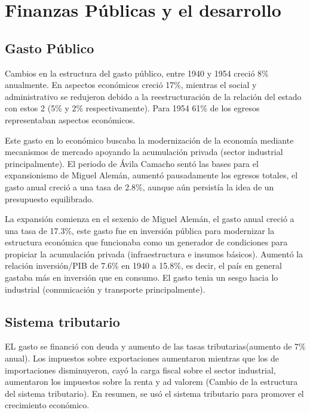 
\section{Finanzas Públicas y el desarrollo}
\subsection{Gasto Público}
Cambios en la estructura del gasto público, entre 1940 y 1954 creció 8\% anualmente. En aspectos económicos creció 17\%, mientras el social y administrativo se redujeron debido a la reestructuración de la relación del estado con estos 2 (5\% y 2\% respectivamente). Para 1954 61\% de los egresos representaban aspectos económicos.

Este gasto en lo económico buscaba la modernización de la economía mediante mecanismos de mercado apoyando la acumulación privada (sector industrial principalmente).
El periodo de Ávila Camacho sentó las bases para el expansionismo de Miguel Alemán, aumentó pausadamente los egresos totales, el gasto anual creció a una tasa de 2.8\%, aunque aún persistía la idea de un presupuesto equilibrado.

La expansión comienza en el sexenio de Miguel Alemán, el gasto anual creció a una tasa de 17.3\%, este gasto fue en inversión pública para modernizar la estructura económica que funcionaba como un generador de condiciones para propiciar la acumulación privada (infraestructura e insumos básicos). Aumentó la relación inversión/PIB de 7.6\% en 1940 a 15.8\%, es decir, el país en general gastaba más en inversión que en consumo. El gasto tenia un sesgo hacia lo industrial (comunicación y transporte principalmente).

\subsection{Sistema tributario}
 EL gasto se financió con deuda y aumento de las tasas tributarias(aumento de 7\% anual). Los impuestos sobre exportaciones aumentaron mientras que los de importaciones disminuyeron, cayó la carga fiscal sobre el sector industrial, aumentaron los impuestos sobre la renta y ad valorem (Cambio de la estructura del sistema tributario). En resumen, se usó el sistema tributario para promover el crecimiento económico.

